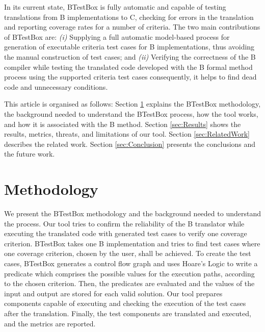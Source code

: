 \documentclass[runningheads]{llncs}
\begin{document}
In its current state, BTestBox is fully automatic and capable of testing translations from B implementations to C, checking for errors in the translation and reporting coverage rates for a number of criteria. 
The two main contributions of BTestBox are: 
\textit{(i)} Supplying a full automatic model-based process for generation of executable criteria test cases for B implementations, thus avoiding the manual  construction of test cases; and
\textit{(ii)} Verifying the correctness of the B compiler while testing the translated code developed with the B formal method process using the supported criteria test cases consequently, it helps to find dead code and unnecessary conditions.

This article is organised as follows: 
Section \ref{sec:BTestBox} explains the BTestBox methodology, the background needed to understand the BTestBox process, how the tool works, and how it is associated with the B method. 
Section \ref{sec:Results} shows the results, metrics, threats, and limitations of our tool. 
Section \ref{sec:RelatedWork} describes the related work. 
Section \ref{sec:Conclusion} presents the conclusions and the future work.

\section{Methodology} \label{sec:BTestBox}

We present the BTestBox methodology and the background needed to understand the process. 
Our tool tries to confirm the reliability of the B translator while executing the translated code with generated test cases to verify one coverage criterion.
BTestBox takes one B implementation and tries to find test cases where one coverage criterion, chosen by the user, shall be achieved. 
To create the test cases, BTestBox generates a control flow graph and uses Hoare's Logic to write a predicate which comprises the possible values for the execution paths, according to the chosen criterion. 
Then, the predicates are evaluated and the values of the input and output are stored for each valid solution. 
Our tool prepares components capable of executing and checking the execution of the test cases after the translation. Finally, the test components are translated and executed, and the metrics are reported.
\end{document}

